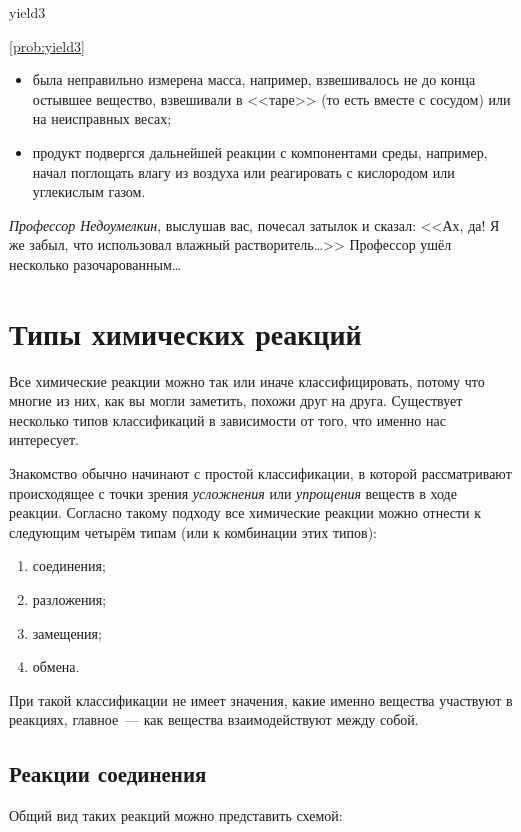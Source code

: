 \begin{problem}{}{yield3}
\begin{sol}{\ref{prob:yield3}}
\begin{itemize}
            \item была неправильно измерена масса, например, взвешивалось не до конца остывшее вещество, взвешивали в <<таре>> (то есть вместе с сосудом) или на неисправных весах;
            \item продукт подвергся дальнейшей реакции с компонентами среды, например, начал поглощать влагу из воздуха или реагировать с кислородом или углекислым газом.
        \end{itemize}
        \textit{Профессор Недоумелкин}, выслушав вас, почесал затылок и сказал: <<Ах, да! Я же забыл, что использовал влажный растворитель\ldots>> Профессор ушёл несколько разочарованным\ldots
    \end{sol}
\end{problem}

\clearpage

\section{Типы химических реакций}

Все химические реакции можно так или иначе классифицировать, потому что многие из них, как вы могли заметить, похожи друг на друга. Существует несколько типов классификаций в зависимости от того, что именно нас интересует.

Знакомство обычно начинают с простой классификации, в которой рассматривают происходящее с точки зрения \emph{усложнения} или \emph{упрощения} веществ в ходе реакции. Согласно такому подходу все химические реакции можно отнести к следующим четырём типам (или к комбинации этих типов):

\begin{enumerate}[label=\arabic*)]
    \item соединения;
    \item разложения;
    \item замещения;
    \item обмена.
\end{enumerate}

При такой классификации не имеет значения, какие именно вещества участвуют в реакциях, главное~--- как вещества взаимодействуют между собой.

\subsection*{Реакции соединения}

Общий вид таких реакций можно представить схемой:

